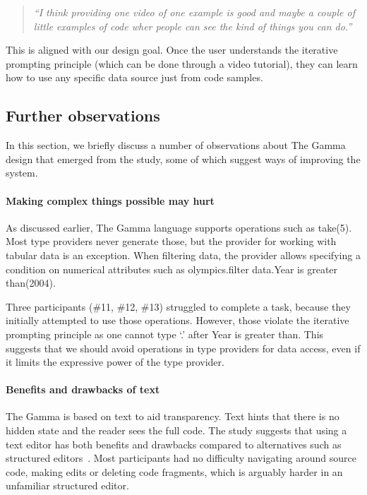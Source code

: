 \documentclass[manuscript,review,anonymous]{acmart}
\newcommand{\ikvd}[1]{{\fontfamily{zi4}\selectfont\small #1}}
\begin{document}
\begin{quote}
  \emph{``I think providing one video of one example is good and maybe a couple of little examples
  of code wher people can see the kind of things you can do.''}
\end{quote}

This is aligned with our design goal. Once the user understands the iterative prompting principle
(which can be done through a video tutorial), they can learn how to use any specific data source
just from code samples.

\subsection{Further observations}
In this section, we briefly discuss a number of observations about The Gamma design that
emerged from the study, some of which suggest ways of improving the system.

\paragraph{Making complex things possible may hurt}
As discussed earlier, The Gamma language supports operations such as \ikvd{take(5)}. Most type
providers never generate those, but the provider for working with tabular data is an exception.
When filtering data, the provider allows specifying a condition on numerical attributes such as
\ikvd{olympics.\textquotesingle filter data\textquotesingle.\textquotesingle Year is greater than\textquotesingle(2004)}.

Three participants (\#11, \#12, \#13) struggled to complete a task, because they
initially attempted to use those operations. However, those violate the iterative prompting
principle as one cannot type `.' after \ikvd{\textquotesingle Year is greater than\textquotesingle}.
This suggests that we should avoid operations in type providers for data access, even if it
limits the expressive power of the type provider.

\paragraph{Benefits and drawbacks of text}
The Gamma is based on text to aid transparency. Text hints that there is no hidden state and
the reader sees the full code. The study suggests that using a text editor has both
benefits and drawbacks compared to alternatives such as structured editors~\cite{structure-based,livenut,lamdu}.
Most participants had no difficulty navigating around source code, making edits or deleting code
fragments, which is arguably harder in an unfamiliar structured editor.
\end{document}
